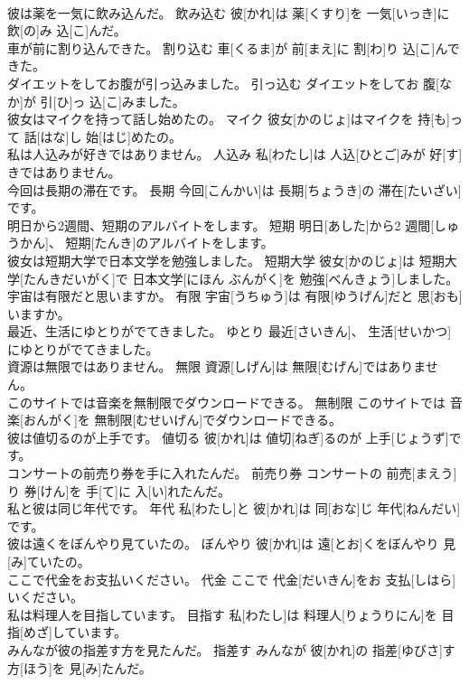 \documentclass[8pt]{extreport}
\begin{document}
\begin{CJK}{UTF8}{min}
\\	彼は薬を一気に飲み込んだ。	飲み込む	彼[かれ]は 薬[くすり]を 一気[いっき]に 飲[の]み 込[こ]んだ。	
\\	車が前に割り込んできた。	割り込む	車[くるま]が 前[まえ]に 割[わ]り 込[こ]んできた。	
\\	ダイエットをしてお腹が引っ込みました。	引っ込む	ダイエットをしてお 腹[なか]が 引[ひ]っ 込[こ]みました。	
\\	彼女はマイクを持って話し始めたの。	マイク	彼女[かのじょ]はマイクを 持[も]って 話[はな]し 始[はじ]めたの。	
\\	私は人込みが好きではありません。	人込み	私[わたし]は 人込[ひとご]みが 好[す]きではありません。	
\\	今回は長期の滞在です。	長期	今回[こんかい]は 長期[ちょうき]の 滞在[たいざい]です。	
\\	明日から2週間、短期のアルバイトをします。	短期	明日[あした]から2 週間[しゅうかん]、 短期[たんき]のアルバイトをします。	
\\	彼女は短期大学で日本文学を勉強しました。	短期大学	彼女[かのじょ]は 短期大学[たんきだいがく]で 日本文学[にほん ぶんがく]を 勉強[べんきょう]しました。	
\\	宇宙は有限だと思いますか。	有限	宇宙[うちゅう]は 有限[ゆうげん]だと 思[おも]いますか。	
\\	最近、生活にゆとりがでてきました。	ゆとり	最近[さいきん]、 生活[せいかつ]にゆとりがでてきました。	
\\	資源は無限ではありません。	無限	資源[しげん]は 無限[むげん]ではありません。	
\\	このサイトでは音楽を無制限でダウンロードできる。	無制限	このサイトでは 音楽[おんがく]を 無制限[むせいげん]でダウンロードできる。	
\\	彼は値切るのが上手です。	値切る	彼[かれ]は 値切[ねぎ]るのが 上手[じょうず]です。	
\\	コンサートの前売り券を手に入れたんだ。	前売り券	コンサートの 前売[まえう]り 券[けん]を 手[て]に 入[い]れたんだ。	
\\	私と彼は同じ年代です。	年代	私[わたし]と 彼[かれ]は 同[おな]じ 年代[ねんだい]です。	
\\	彼は遠くをぼんやり見ていたの。	ぼんやり	彼[かれ]は 遠[とお]くをぼんやり 見[み]ていたの。	
\\	ここで代金をお支払いください。	代金	ここで 代金[だいきん]をお 支払[しはら]いください。	
\\	私は料理人を目指しています。	目指す	私[わたし]は 料理人[りょうりにん]を 目指[めざ]しています。	
\\	みんなが彼の指差す方を見たんだ。	指差す	みんなが 彼[かれ]の 指差[ゆびさ]す 方[ほう]を 見[み]たんだ。	

\end{CJK}
\end{document}
